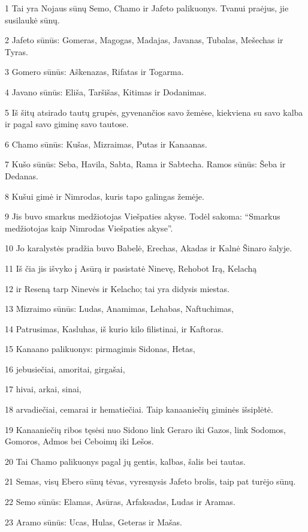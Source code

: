 \par 1 Tai yra Nojaus sūnų Semo, Chamo ir Jafeto palikuonys. Tvanui praėjus, jie susilaukė sūnų. 
\par 2 Jafeto sūnūs: Gomeras, Magogas, Madajas, Javanas, Tubalas, Mešechas ir Tyras. 
\par 3 Gomero sūnūs: Aškenazas, Rifatas ir Togarma. 
\par 4 Javano sūnūs: Eliša, Taršišas, Kitimas ir Dodanimas. 
\par 5 Iš šitų atsirado tautų grupės, gyvenančios savo žemėse, kiekviena su savo kalba ir pagal savo giminę savo tautose. 
\par 6 Chamo sūnūs: Kušas, Mizraimas, Putas ir Kanaanas. 
\par 7 Kušo sūnūs: Seba, Havila, Sabta, Rama ir Sabtecha. Ramos sūnūs: Šeba ir Dedanas. 
\par 8 Kušui gimė ir Nimrodas, kuris tapo galingas žemėje. 
\par 9 Jis buvo smarkus medžiotojas Viešpaties akyse. Todėl sakoma: “Smarkus medžiotojas kaip Nimrodas Viešpaties akyse”. 
\par 10 Jo karalystės pradžia buvo Babelė, Erechas, Akadas ir Kalnė Šinaro šalyje. 
\par 11 Iš čia jis išvyko į Asūrą ir pasistatė Ninevę, Rehobot Irą, Kelachą 
\par 12 ir Reseną tarp Ninevės ir Kelacho; tai yra didysis miestas. 
\par 13 Mizraimo sūnūs: Ludas, Anamimas, Lehabas, Naftuchimas, 
\par 14 Patrusimas, Kasluhas, iš kurio kilo filistinai, ir Kaftoras. 
\par 15 Kanaano palikuonys: pirmagimis Sidonas, Hetas, 
\par 16 jebusiečiai, amoritai, girgašai, 
\par 17 hivai, arkai, sinai, 
\par 18 arvadiečiai, cemarai ir hematiečiai. Taip kanaaniečių giminės išsiplėtė. 
\par 19 Kanaaniečių ribos tęsėsi nuo Sidono link Geraro iki Gazos, link Sodomos, Gomoros, Admos bei Ceboimų iki Lešos. 
\par 20 Tai Chamo palikuonys pagal jų gentis, kalbas, šalis bei tautas. 
\par 21 Semas, visų Ebero sūnų tėvas, vyresnysis Jafeto brolis, taip pat turėjo sūnų. 
\par 22 Semo sūnūs: Elamas, Asūras, Arfaksadas, Ludas ir Aramas. 
\par 23 Aramo sūnūs: Ucas, Hulas, Geteras ir Mašas. 
